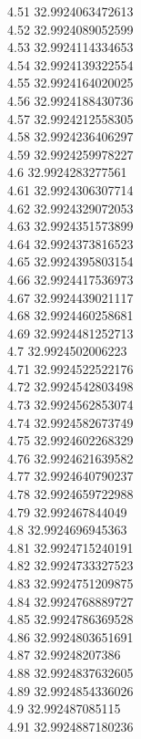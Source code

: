 {4.51	32.9924063472613\\
4.52	32.9924089052599\\
4.53	32.9924114334653\\
4.54	32.9924139322554\\
4.55	32.9924164020025\\
4.56	32.9924188430736\\
4.57	32.9924212558305\\
4.58	32.9924236406297\\
4.59	32.9924259978227\\
4.6	32.9924283277561\\
4.61	32.9924306307714\\
4.62	32.9924329072053\\
4.63	32.9924351573899\\
4.64	32.9924373816523\\
4.65	32.9924395803154\\
4.66	32.9924417536973\\
4.67	32.9924439021117\\
4.68	32.9924460258681\\
4.69	32.9924481252713\\
4.7	32.9924502006223\\
4.71	32.9924522522176\\
4.72	32.9924542803498\\
4.73	32.9924562853074\\
4.74	32.9924582673749\\
4.75	32.9924602268329\\
4.76	32.9924621639582\\
4.77	32.9924640790237\\
4.78	32.9924659722988\\
4.79	32.992467844049\\
4.8	32.9924696945363\\
4.81	32.9924715240191\\
4.82	32.9924733327523\\
4.83	32.9924751209875\\
4.84	32.9924768889727\\
4.85	32.9924786369528\\
4.86	32.9924803651691\\
4.87	32.99248207386\\
4.88	32.9924837632605\\
4.89	32.9924854336026\\
4.9	32.992487085115\\
4.91	32.9924887180236\\
}
